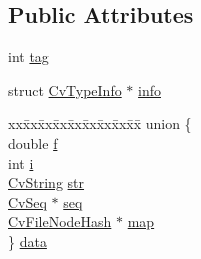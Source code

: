 \subsection*{Public Attributes}
\begin{DoxyCompactItemize}
\item 
int \hyperlink{structCvFileNode_ac0bb5efe70f520883caa5966e4116b0d}{tag}
\item 
struct \hyperlink{structCvTypeInfo}{Cv\-Type\-Info} $\ast$ \hyperlink{structCvFileNode_a70ed8cf9a3e5b24aa8ec462537513b89}{info}
\item 
\begin{tabbing}
xx\=xx\=xx\=xx\=xx\=xx\=xx\=xx\=xx\=\kill
union \{\\
\>double \hyperlink{structCvFileNode_a4c8bb4f7092b56aad9c3a7d7f2dfff2d}{f}\\
\>int \hyperlink{structCvFileNode_afadd155e3f165fc945e0fe2a3ce05831}{i}\\
\>\hyperlink{structCvString}{CvString} \hyperlink{structCvFileNode_abab378a457de42bc84259515c5bdec9f}{str}\\
\>\hyperlink{structCvSeq}{CvSeq} $\ast$ \hyperlink{structCvFileNode_ab2d72866b14ccf2414404f0c5ba443bb}{seq}\\
\>\hyperlink{core_2types__c_8h_a88376488ce3898aeea192d7e43477320}{CvFileNodeHash} $\ast$ \hyperlink{structCvFileNode_a0c054f98473908434e02f37603d746c7}{map}\\
\} \hyperlink{structCvFileNode_a533ef312fade7e33eb1d7abedfddc696}{data}\\

\end{tabbing}\end{DoxyCompactItemize}


